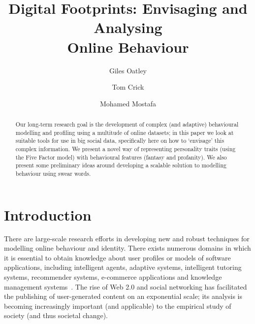 \documentclass{AISB2008}
\begin{document}
\title{Digital Footprints: Envisaging and Analysing\\Online Behaviour}

\author{Giles Oatley \and Tom Crick \and Mohamed
  Mostafa}

\maketitle


\begin{abstract}
Our long-term research goal is the development of complex (and
adaptive) behavioural modelling and profiling using a multitude of
online datasets; in this paper we look at suitable tools for use in
big social data, specifically here on how to `envisage' this complex
information. We present a novel way of representing personality traits
(using the Five Factor model) with behavioural features (fantasy and
profanity).  We also present some preliminary ideas around developing
a scalable solution to modelling behaviour using swear words.
\end{abstract}


\section{Introduction}

There are large-scale research efforts in developing new and robust
techniques for modelling online behaviour and identity. There exists
numerous domains in which it is essential to obtain knowledge about
user profiles or models of software applications, including
intelligent agents, adaptive systems, intelligent tutoring systems,
recommender systems, e-commerce applications and knowledge management
systems~\cite{schiaffino+amandi:2009}. The rise of Web 2.0 and social
networking has facilitated the publishing of user-generated content on
an exponential scale; its analysis is becoming increasingly important
(and applicable) to the empirical study of society (and thus societal
change).
\end{document}
